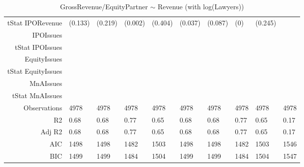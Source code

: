\begin{table}[ht]
\begin{tabular}{rlllllllll}
  tStat IPORevenue & (0.133) & (0.219) & (0.002) & (0.404) & (0.037) & (0.087) & (0) & (0.245) &  \\ 
  IPOIssues &  &  &  &  &  &  &  &  &  \\ 
  tStat IPOIssues &  &  &  &  &  &  &  &  &  \\ 
  EquityIssues &  &  &  &  &  &  &  &  &  \\ 
  tStat EquityIssues &  &  &  &  &  &  &  &  &  \\ 
  MnAIssues &  &  &  &  &  &  &  &  &  \\ 
  tStat MnAIssues &  &  &  &  &  &  &  &  &  \\ 
  Observations & 4978 & 4978 & 4978 & 4978 & 4978 & 4978 & 4978 & 4978 & 4978 \\ 
  R2 & 0.68 & 0.68 & 0.77 & 0.65 & 0.68 & 0.68 & 0.77 & 0.65 & 0.17 \\ 
  Adj R2 & 0.68 & 0.68 & 0.77 & 0.65 & 0.68 & 0.68 & 0.77 & 0.65 & 0.17 \\ 
  AIC & 1498 & 1498 & 1482 & 1503 & 1498 & 1498 & 1482 & 1503 & 1546 \\ 
  BIC & 1499 & 1499 & 1484 & 1504 & 1499 & 1499 & 1484 & 1504 & 1547 \\ 
   \hline
\end{tabular}
\caption{GrossRevenue/EquityPartner $\sim$ Revenue (with log(Lawyers))} 
\end{table}
